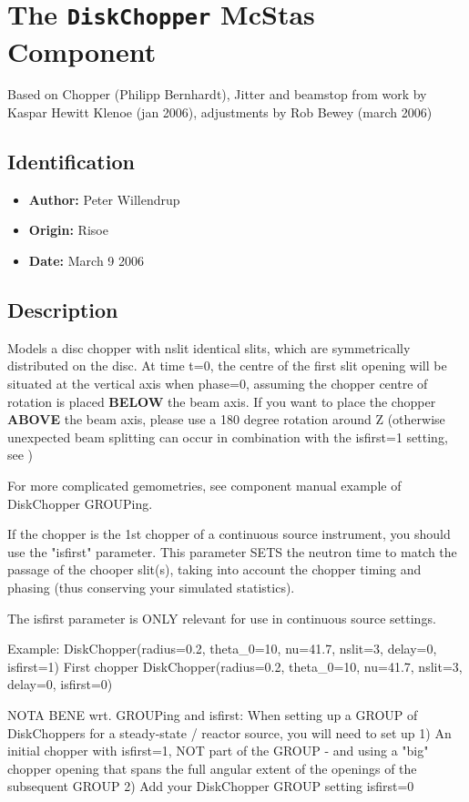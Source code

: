 \section{The \texttt{DiskChopper} McStas Component}
Based on Chopper (Philipp Bernhardt), Jitter and beamstop from work by
Kaspar Hewitt Klenoe (jan 2006), adjustments by Rob Bewey (march 2006)

\subsection*{Identification}
\begin{itemize}
  \item \textbf{Author:} Peter Willendrup
  \item \textbf{Origin:} Risoe
  \item \textbf{Date:} March 9 2006
\end{itemize}

\subsection*{Description}
Models a disc chopper with nslit identical slits, which are symmetrically distributed on the disc. At time t=0, the centre of the first slit opening will be situated at the vertical axis when phase=0, assuming the chopper centre of rotation is placed \textbf{BELOW} the beam axis. If you want to place the chopper \textbf{ABOVE} the beam axis, please use a 180 degree rotation around Z (otherwise unexpected beam splitting can occur in combination with the isfirst=1 setting, see )

For more complicated gemometries, see component manual example of DiskChopper GROUPing.

If the chopper is the 1st chopper of a continuous source instrument, you should use the "isfirst" parameter. This parameter SETS the neutron time to match the passage of the chooper slit(s), taking into account the chopper timing and phasing (thus conserving your simulated statistics).

The isfirst parameter is ONLY relevant for use in continuous source settings.

Example: DiskChopper(radius=0.2, theta\_0=10, nu=41.7, nslit=3, delay=0, isfirst=1) First chopper DiskChopper(radius=0.2, theta\_0=10, nu=41.7, nslit=3, delay=0, isfirst=0)

NOTA BENE wrt. GROUPing and isfirst: When setting up a GROUP of DiskChoppers for a steady-state / reactor source, you will need to set up 1) An initial chopper with isfirst=1, NOT part of the GROUP - and using a "big" chopper opening that spans the full angular extent of the openings of the subsequent GROUP 2) Add your DiskChopper GROUP setting isfirst=0

